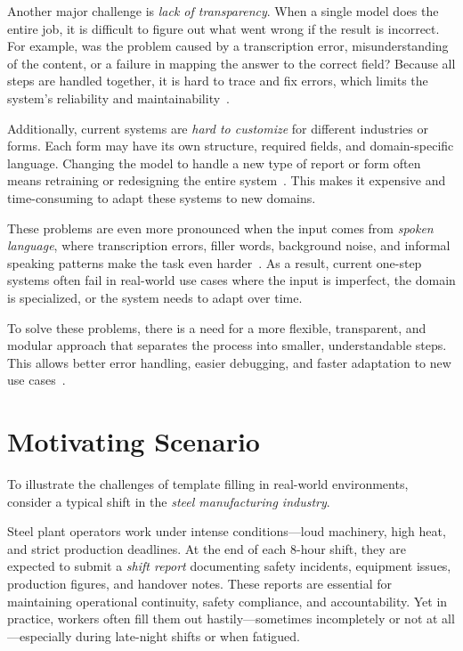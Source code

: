 Another major challenge is \textit{lack of transparency}. When a single model does the entire job, it is difficult to figure out what went wrong if the result is incorrect. For example, was the problem caused by a transcription error, misunderstanding of the content, or a failure in mapping the answer to the correct field? Because all steps are handled together, it is hard to trace and fix errors, which limits the system’s reliability and maintainability~\cite{schick2023toolformer}.

Additionally, current systems are \textit{hard to customize} for different industries or forms. Each form may have its own structure, required fields, and domain-specific language. Changing the model to handle a new type of report or form often means retraining or redesigning the entire system~\cite{du2021template, mialon2023augmented}. This makes it expensive and time-consuming to adapt these systems to new domains.

These problems are even more pronounced when the input comes from \textit{spoken language}, where transcription errors, filler words, background noise, and informal speaking patterns make the task even harder~\cite{radford2023whisper, fathullah2023prompting}. As a result, current one-step systems often fail in real-world use cases where the input is imperfect, the domain is specialized, or the system needs to adapt over time.

To solve these problems, there is a need for a more flexible, transparent, and modular approach that separates the process into smaller, understandable steps. This allows better error handling, easier debugging, and faster adaptation to new use cases~\cite{mialon2023augmented, schick2023toolformer}.

\section{Motivating Scenario}

To illustrate the challenges of template filling in real-world environments, consider a typical shift in the \textit{steel manufacturing industry}.

Steel plant operators work under intense conditions—loud machinery, high heat, and strict production deadlines. At the end of each 8-hour shift, they are expected to submit a \textit{shift report} documenting safety incidents, equipment issues, production figures, and handover notes. These reports are essential for maintaining operational continuity, safety compliance, and accountability. Yet in practice, workers often fill them out hastily—sometimes incompletely or not at all—especially during late-night shifts or when fatigued.

